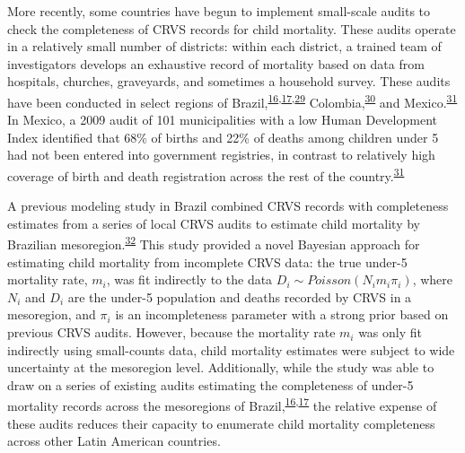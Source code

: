 \documentclass[
]{article}
\begin{document}
More recently, some countries have begun to implement small-scale audits to check the completeness of CRVS records for child mortality. These audits operate in a relatively small number of districts: within each district, a trained team of investigators develops an exhaustive record of mortality based on data from hospitals, churches, graveyards, and sometimes a household survey. These audits have been conducted in select regions of Brazil,\textsuperscript{\protect\hyperlink{ref-DeFrias2013}{16},\protect\hyperlink{ref-Szwarcwald2014}{17},\protect\hyperlink{ref-DeAlmeida2017a}{29}} Colombia,\textsuperscript{\protect\hyperlink{ref-NationalAdminstrativeDepartmentofStatisticsDANE2006}{30}} and Mexico.\textsuperscript{\protect\hyperlink{ref-Hernandez2012}{31}} In Mexico, a 2009 audit of 101 municipalities with a low Human Development Index identified that 68\% of births and 22\% of deaths among children under 5 had not been entered into government registries, in contrast to relatively high coverage of birth and death registration across the rest of the country.\textsuperscript{\protect\hyperlink{ref-Hernandez2012}{31}}

A previous modeling study in Brazil combined CRVS records with completeness estimates from a series of local CRVS audits to estimate child mortality by Brazilian mesoregion.\textsuperscript{\protect\hyperlink{ref-Schmertmann2018a}{32}} This study provided a novel Bayesian approach for estimating child mortality from incomplete CRVS data: the true under-5 mortality rate, \(m_i\), was fit indirectly to the data \(D_i \sim Poisson(N_im_i\pi_i)\), where \(N_i\) and \(D_i\) are the under-5 population and deaths recorded by CRVS in a mesoregion, and \(\pi_i\) is an incompleteness parameter with a strong prior based on previous CRVS audits. However, because the mortality rate \(m_i\) was only fit indirectly using small-counts data, child mortality estimates were subject to wide uncertainty at the mesoregion level. Additionally, while the study was able to draw on a series of existing audits estimating the completeness of under-5 mortality records across the mesoregions of Brazil,\textsuperscript{\protect\hyperlink{ref-DeFrias2013}{16},\protect\hyperlink{ref-Szwarcwald2014}{17}} the relative expense of these audits reduces their capacity to enumerate child mortality completeness across other Latin American countries.
\end{document}
